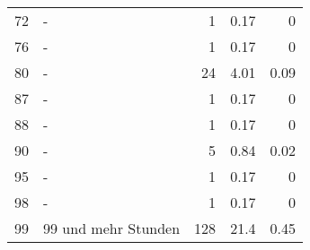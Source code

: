 \begin{longtable}{lXrrr}
        72 & \multicolumn{1}{X}{-} & %
          \num{1} &
          \num[round-mode=places,round-precision=2]{0.17} &
          \num[round-mode=places,round-precision=2]{0} \\

        76 & \multicolumn{1}{X}{-} & %
          \num{1} &
          \num[round-mode=places,round-precision=2]{0.17} &
          \num[round-mode=places,round-precision=2]{0} \\

        80 & \multicolumn{1}{X}{-} & %
          \num{24} &
          \num[round-mode=places,round-precision=2]{4.01} &
          \num[round-mode=places,round-precision=2]{0.09} \\

        87 & \multicolumn{1}{X}{-} & %
          \num{1} &
          \num[round-mode=places,round-precision=2]{0.17} &
          \num[round-mode=places,round-precision=2]{0} \\

        88 & \multicolumn{1}{X}{-} & %
          \num{1} &
          \num[round-mode=places,round-precision=2]{0.17} &
          \num[round-mode=places,round-precision=2]{0} \\

        90 & \multicolumn{1}{X}{-} & %
          \num{5} &
          \num[round-mode=places,round-precision=2]{0.84} &
          \num[round-mode=places,round-precision=2]{0.02} \\

        95 & \multicolumn{1}{X}{-} & %
          \num{1} &
          \num[round-mode=places,round-precision=2]{0.17} &
          \num[round-mode=places,round-precision=2]{0} \\

        98 & \multicolumn{1}{X}{-} & %
          \num{1} &
          \num[round-mode=places,round-precision=2]{0.17} &
          \num[round-mode=places,round-precision=2]{0} \\

        99 & \multicolumn{1}{X}{99 und mehr Stunden} & %
          \num{128} &
          \num[round-mode=places,round-precision=2]{21.4} &
          \num[round-mode=places,round-precision=2]{0.45} \\


\end{longtable}
